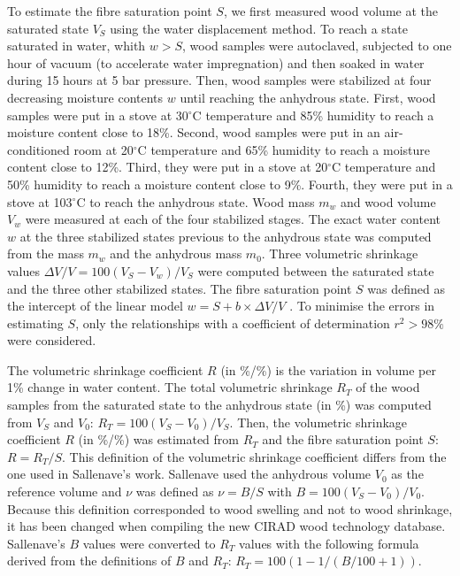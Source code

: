 \documentclass[a4paper, 12pt, leqno, dvipsnames]{article}\usepackage[]{graphicx}\usepackage[]{color}
\begin{document}
To estimate the fibre saturation point $S$, we first measured wood volume at the saturated state $V_S$ using the water displacement method. To reach a state saturated in water, whith $w>S$, wood samples were autoclaved, subjected to one hour of vacuum (to accelerate water impregnation) and then soaked in water during 15 hours at 5 bar pressure. Then, wood samples were stabilized at four decreasing moisture contents $w$ until reaching the anhydrous state. First, wood samples were put in a stove at 30$^\circ$C temperature and 85\% humidity to reach a moisture content close to 18\%. Second, wood samples were put in an air-conditioned room at 20$^\circ$C temperature and 65\% humidity to reach a moisture content close to 12\%. Third, they were put in a stove at 20$^\circ$C temperature and 50\% humidity to reach a moisture content close to 9\%. Fourth, they were put in a stove at 103$^\circ$C to reach the anhydrous state. Wood mass $m_w$ and wood volume $V_w$ were measured at each of the four stabilized stages. The exact water content $w$ at the three stabilized states previous to the anhydrous state was computed from the mass $m_w$ and the anhydrous mass $m_0$. Three volumetric shrinkage values $\Delta{V}/V = 100(V_S-V_w)/V_S$ were computed between the saturated state and the three other stabilized states. The fibre saturation point $S$ was defined as the intercept of the linear model $w = S + b \times \Delta{V}/V$ \citep{Stamm1964}. To minimise the errors in estimating $S$, only the relationships with a coefficient of determination $r^2 > 98\%$ were considered.

The volumetric shrinkage coefficient $R$ (in \%/\%) is the variation in volume per 1\% change in water content. The total volumetric shrinkage $R_T$ of the wood samples from the saturated state to the anhydrous state (in \%) was computed from $V_S$ and $V_0$: $R_T=100(V_S-V_0)/V_S$. Then, the volumetric shrinkage coefficient $R$ (in \%/\%) was estimated from $R_T$ and the fibre saturation point $S$: $R=R_T/S$. This definition of the volumetric shrinkage coefficient differs from the one used in Sallenave's work. Sallenave used the anhydrous volume $V_0$ as the reference volume and $\nu$ was defined as $\nu=B/S$ with $B=100(V_S-V_0)/V_0$. Because this definition corresponded to wood swelling and not to wood shrinkage, it has been changed when compiling the new CIRAD wood technology database. Sallenave's $B$ values were converted to $R_T$ values with the following formula derived from the definitions of $B$ and $R_T$: $R_T=100(1-1/(B/100+1))$. 
\end{document}
